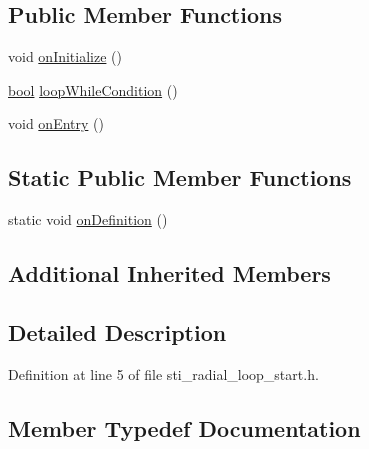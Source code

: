 \subsection*{Public Member Functions}
\begin{DoxyCompactItemize}
\item 
void \hyperlink{structsm__dance__bot_1_1radial__motion__states_1_1StiRadialLoopStart_a4ae989df82246325393439323ed18d46}{on\+Initialize} ()
\item 
\hyperlink{classbool}{bool} \hyperlink{structsm__dance__bot_1_1radial__motion__states_1_1StiRadialLoopStart_a05d31b8062dae8eccc4d66ab21a0b720}{loop\+While\+Condition} ()
\item 
void \hyperlink{structsm__dance__bot_1_1radial__motion__states_1_1StiRadialLoopStart_a83662aeb4d86fe809ea02bc186e32415}{on\+Entry} ()
\end{DoxyCompactItemize}
\subsection*{Static Public Member Functions}
\begin{DoxyCompactItemize}
\item 
static void \hyperlink{structsm__dance__bot_1_1radial__motion__states_1_1StiRadialLoopStart_adeea051d0c80274936b36d7e4295b8e5}{on\+Definition} ()
\end{DoxyCompactItemize}
\subsection*{Additional Inherited Members}


\subsection{Detailed Description}


Definition at line 5 of file sti\+\_\+radial\+\_\+loop\+\_\+start.\+h.



\subsection{Member Typedef Documentation}
